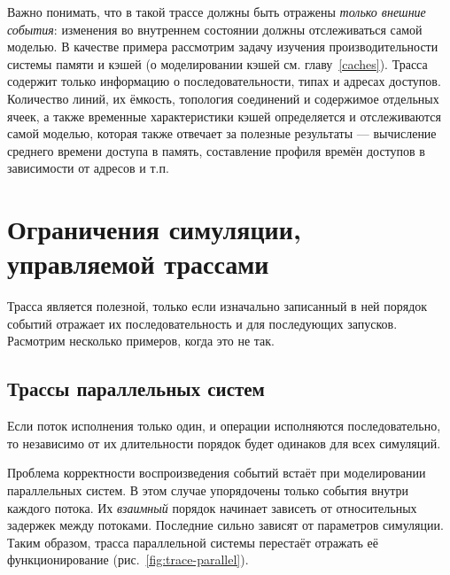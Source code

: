 Важно понимать, что в такой трассе должны быть отражены \textit{только внешние события}: изменения во внутреннем состоянии должны отслеживаться самой моделью. В качестве примера рассмотрим задачу изучения производительности системы памяти и кэшей (о моделировании кэшей см. главу~\ref{caches}). Трасса содержит только информацию о последовательности, типах и адресах доступов. Количество линий, их ёмкость, топология соединений и содержимое отдельных ячеек, а также временные характеристики кэшей определяется и отслеживаются самой моделью, которая также отвечает за полезные результаты --- вычисление среднего времени доступа в память, составление профиля времён доступов в зависимости от адресов и т.п.


\section[Ограничения трасс]{Ограничения симуляции, управляемой трассами}

Трасса является полезной, только если изначально записанный в ней порядок событий отражает их последовательность и для последующих запусков. Расмотрим несколько примеров, когда это не так.

\subsection{Трассы параллельных систем}

Если поток исполнения только один, и операции исполняются последовательно, то независимо от их длительности порядок будет одинаков для всех симуляций.

Проблема корректности воспроизведения событий встаёт при моделировании параллельных систем. В этом случае упорядочены только события внутри каждого потока. Их \textit{взаимный} порядок начинает зависеть от относительных задержек между потоками. Последние сильно зависят от параметров симуляции. Таким образом, трасса параллельной системы перестаёт отражать её функционирование (рис.~\ref{fig:trace-parallel}).

